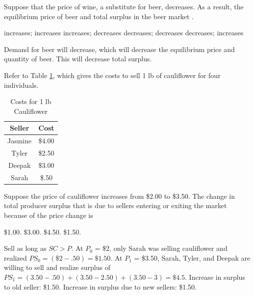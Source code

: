 \documentclass[addpoints,11pt]{exam}
\theoremstyle{definition}
\newcommand{\blank}[0]{\underline{\hspace{3cm}}}
\begin{document}
\begin{questions}
	\question Suppose that the price of wine, a substitute for beer, decreases. As a result, the equilibrium price of beer \blank and total surplus in the beer market \blank. 
	
	\begin{choices}
		\choice increases; increases
		\choice increases; decreases
		\CorrectChoice decreases; decreases
		\choice decreases; increases
	\end{choices}
	
	\begin{solution}
		Demand for beer will decrease, which will decrease the equilibrium price and quantity of beer. This will decrease total surplus.
	\end{solution}
	
		\question Refer to Table \ref{wtp2}, which gives the costs to sell 1 lb of cauliflower for four individuals.
		
		\begin{table}[H]
			\caption{Costs for 1 lb Cauliflower}
			\label{wtp2}
			\centering
			\begin{tabular}{  c|c    }    
				
				Seller   & Cost \\
				\hline
				Jasmine & \$4.00 \\
				Tyler & \$2.50 \\
				Deepak & \$3.00 \\
				Sarah & \$.50 \\
			\end{tabular}
			
		\end{table} 
		
		Suppose the price of cauliflower increases from \$2.00 to \$3.50. The change in total producer surplus that is due to sellers entering or exiting the market because of the price change is
		
		\begin{choices}
			\choice \$1.00.
			\choice \$3.00.
			\choice \$4.50.
			\CorrectChoice \$1.50.
		\end{choices}
		
		\begin{solution}
			Sell as long as $SC > P$. At $P_0$ = \$2, only Sarah was selling cauliflower and realized $PS_0 = (\$2 - .50) = \$1.50$. At $P_1$ = \$3.50, Sarah, Tyler, and Deepak are willing to sell and realize surplus of $PS_1 = (3.50 - .50) + (3.50 - 2.50) + (3.50 - 3) = \$4.5$. Increase in surplus to old seller: \$1.50. Increase in surplus due to new sellers: \$1.50.
		\end{solution}
		

\end{questions}
\end{document}
